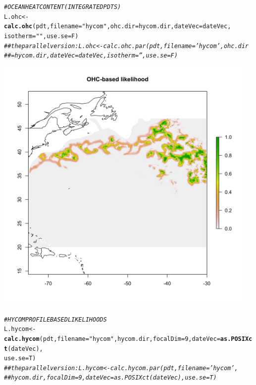 \documentclass{article}\usepackage[]{graphicx}\usepackage[]{color}
\makeatletter
\newcommand{\hlnum}[1]{\textcolor[rgb]{0.686,0.059,0.569}{#1}}%
\newcommand{\hlstr}[1]{\textcolor[rgb]{0.192,0.494,0.8}{#1}}%
\newcommand{\hlcom}[1]{\textcolor[rgb]{0.678,0.584,0.686}{\textit{#1}}}%
\newcommand{\hlstd}[1]{\textcolor[rgb]{0.345,0.345,0.345}{#1}}%
\newcommand{\hlkwb}[1]{\textcolor[rgb]{0.69,0.353,0.396}{#1}}%
\newcommand{\hlkwc}[1]{\textcolor[rgb]{0.333,0.667,0.333}{#1}}%
\newcommand{\hlkwd}[1]{\textcolor[rgb]{0.737,0.353,0.396}{\textbf{#1}}}%
\newenvironment{kframe}{%
 \def\at@end@of@kframe{}%
 \ifinner\ifhmode%
  \def\at@end@of@kframe{\end{minipage}}%
  \begin{minipage}{\columnwidth}%
 \fi\fi%
 \def\FrameCommand##1{\hskip\@totalleftmargin \hskip-\fboxsep
 \colorbox{shadecolor}{##1}\hskip-\fboxsep
     \hskip-\linewidth \hskip-\@totalleftmargin \hskip\columnwidth}%
 \MakeFramed {\advance\hsize-\width
   \@totalleftmargin\z@ \linewidth\hsize
   \@setminipage}}%
 {\par\unskip\endMakeFramed%
 \at@end@of@kframe}
\newenvironment{knitrout}{}{} %
\makeatother
\begin{document}
\begin{knitrout}\small
{}\color{fgcolor}\begin{kframe}
\begin{alltt}
\hlcom{# OCEAN HEAT CONTENT (INTEGRATED PDTS)}
\hlstd{L.ohc} \hlkwb{<-} \hlkwd{calc.ohc}\hlstd{(pdt,} \hlkwc{filename} \hlstd{=} \hlstr{"hycom"}\hlstd{,} \hlkwc{ohc.dir} \hlstd{= hycom.dir,} \hlkwc{dateVec} \hlstd{= dateVec,}
    \hlkwc{isotherm} \hlstd{=} \hlstr{""}\hlstd{,} \hlkwc{use.se} \hlstd{= F)}
\hlcom{## the parallel version: L.ohc <- calc.ohc.par(pdt, filename='hycom', ohc.dir}
\hlcom{## = hycom.dir, dateVec = dateVec, isotherm = '', use.se = F)}
\end{alltt}
\end{kframe}
\end{knitrout}
\includegraphics[width=5in, keepaspectratio]{./example_ohc_lik.png}

\begin{knitrout}\small
{}\color{fgcolor}\begin{kframe}
\begin{alltt}
\hlcom{# HYCOM PROFILE BASED LIKELIHOODS}
\hlstd{L.hycom} \hlkwb{<-} \hlkwd{calc.hycom}\hlstd{(pdt,} \hlkwc{filename} \hlstd{=} \hlstr{"hycom"}\hlstd{, hycom.dir,} \hlkwc{focalDim} \hlstd{=} \hlnum{9}\hlstd{,} \hlkwc{dateVec} \hlstd{=} \hlkwd{as.POSIXct}\hlstd{(dateVec),}
    \hlkwc{use.se} \hlstd{= T)}
\hlcom{## the parallel version: L.hycom <- calc.hycom.par(pdt, filename='hycom',}
\hlcom{## hycom.dir, focalDim = 9, dateVec = as.POSIXct(dateVec), use.se = T)}
\end{alltt}
\end{kframe}
\end{knitrout}
\end{document}
